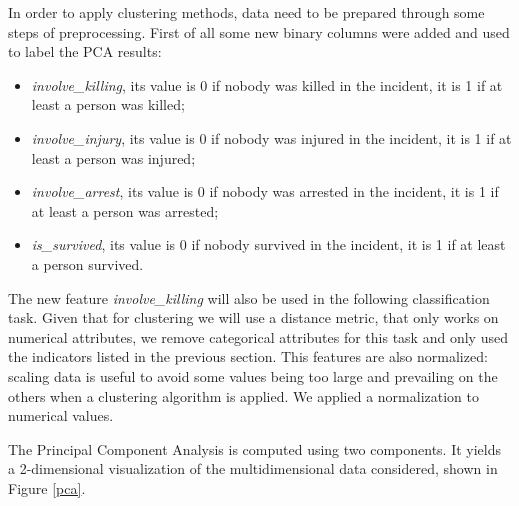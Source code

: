 \documentclass[10pt,a4paper]{report}
\begin{document}
In order to apply clustering methods, data need to be prepared through some steps of preprocessing.
First of all some new binary columns were added and used to label the PCA results:
\begin{itemize}
	\item \textit{involve\_killing}, its value is 0 if nobody was killed in the incident, it is 1 if at least a person was killed;
	\item \textit{involve\_injury}, its value is 0 if nobody was injured in the incident, it is 1 if at least a person was injured;
	\item \textit{involve\_arrest}, its value is 0 if nobody was arrested in the incident, it is 1 if at least a person was arrested;
	\item \textit{is\_survived}, its value is 0 if nobody survived in the incident, it is 1 if at least a person survived.
\end{itemize}
The new feature \textit{involve\_killing} will also be used in the following classification task.
Given that for clustering we will use a distance metric, that only works on numerical attributes, we remove categorical attributes for this task and only used the indicators listed in the previous section.
This features are also normalized: scaling data is useful to avoid some values being too large and prevailing on the others when a clustering algorithm is applied.
We applied a normalization to numerical values.

The Principal Component Analysis is computed using two components.
It yields a 2-dimensional visualization of the multidimensional data considered, shown in Figure \ref{pca}.
\end{document}
